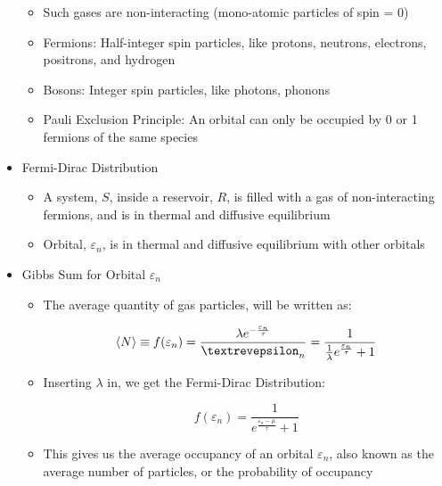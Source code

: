 \begin{itemize}
\begin{itemize}
      \item Such gases are non-interacting (mono-atomic particles of spin = 0)

      \item Fermions: Half-integer spin particles, like protons, neutrons, electrons, positrons, and hydrogen

      \item Bosons: Integer spin particles, like photons, phonons

      \item Pauli Exclusion Principle: An orbital can only be occupied by 0 or 1 fermions of the same species

    \end{itemize}

  \item Fermi-Dirac Distribution

    \begin{itemize}

      \item A system, $S$, inside a reservoir, $R$, is filled with a gas of non-interacting fermions, and is in thermal and diffusive equilibrium

      \item Orbital, $\varepsilon_n$, is in thermal and diffusive equilibrium with other orbitals

    \end{itemize}

  \item Gibbs Sum for Orbital $\varepsilon_n$

    \begin{itemize}

        $$\varepsilon_n=\lambda^0e^{-0/\tau}+\lambda^1e^{-\frac{\varepsilon_n}{\tau}}=1+\lambda e^{-\frac{\varepsilon_n}{\tau}}$$

      \item The average quantity of gas particles, will be written as:

        $$\langle N\rangle\equiv f(\varepsilon_n)=\frac{\lambda e^{-\frac{\varepsilon_n}{\tau}}}{\text{\textrevepsilon}_n}=\frac{1}{\frac{1}{\lambda}e^{\frac{\varepsilon_n}{\tau}}+1}$$

      \item Inserting $\lambda$ in, we get the Fermi-Dirac Distribution:

        $$f(\varepsilon_n)=\frac{1}{e^{\frac{\varepsilon_n-\mu}{\tau}}+1}$$

      \item This gives us the average occupancy of an orbital $\varepsilon_n$, also known as the average number of particles, or the probability of occupancy


\end{itemize}
\end{itemize}

